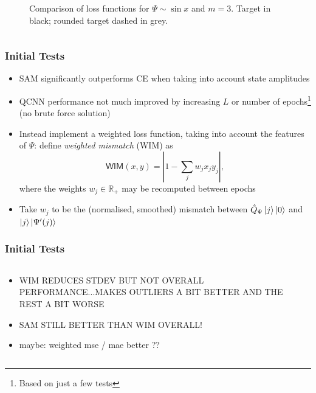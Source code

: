 \documentclass{beamer}
\begin{document}
\begin{frame}
\begin{columns}
\begin{column}{0.5\textwidth}
\begin{figure}[h]
\caption{Comparison of loss functions for $\Psi \sim \sin x$ and $m=3$. Target in black; rounded target dashed in grey.}
\end{figure}
\end{column}
\end{columns}
\end{frame}

\begin{frame}
\frametitle{Initial Tests}
\begin{itemize}
\item \alert{SAM} significantly \alert{outperforms CE} when taking into account state amplitudes 
\item QCNN performance not much improved by increasing $L$ or number of epochs\footnote{Based on just a few tests} (\alert{no brute force solution})
\item Instead implement a \alert{weighted loss function}, taking into account the features of $\Psi$: define \emph{weighted mismatch} (\alert{WIM}) as 
\begin{equation}
\mathsf{WIM}(x,y) =  \left\vert 1 - \sum_j w_j x_j y_j \right \vert, 
\end{equation}
where the weights $w_j \in \mathbb{R}_{+}$ may be recomputed between epochs
\item Take $w_j$ to be the (normalised, smoothed) mismatch between $\hat{Q}_\Psi \ket{j} \ket{0}$ and $\ket{j}\ket{\Psi'(j)}$
\end{itemize}
\end{frame}

\begin{frame}
\frametitle{Initial Tests}
\begin{columns}
\begin{column}{0.5\textwidth}
\begin{itemize}
\item WIM REDUCES STDEV BUT NOT OVERALL PERFORMANCE...MAKES OUTLIERS A BIT BETTER AND THE REST A BIT WORSE 
\item SAM STILL BETTER THAN WIM OVERALL!
\item maybe: weighted mse / mae better ??
\end{itemize}
\end{column}
\begin{column}{0.5\textwidth}

\end{column}
\end{columns}
\end{frame}
\end{document}
